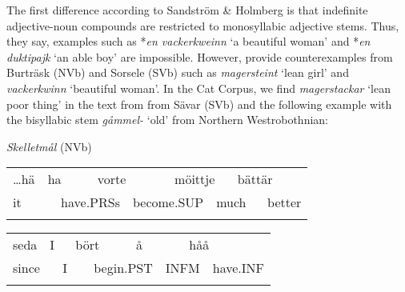 \begin{styleBodytextC}
The first difference according to Sandström \& Holmberg is that indefinite adjective-noun compounds are restricted to monosyllabic adjective stems. Thus, they say, examples such as *\textit{en vackerkweinn }‘a beautiful woman’ and *\textit{en duktipajk }‘an able boy’ are impossible. However, \citet[47]{BergholmEtAl1999} provide counterexamples from Burträsk (NVb) and Sorsele (SVb) such as \textit{magersteint} ‘lean girl’ and \textit{vackerkwinn} ‘beautiful woman’. In the Cat Corpus, we find \textit{magerstackar} ‘lean poor thing’ in the text from from Sävar (SVb) and the following example with the bisyllabic stem \textit{gåmmel-} ‘old’ from Northern Westrobothnian:

\end{styleBodytextC}

\begin{listWWNumileveli}
\item {}

\begin{styleExample}
\textit{Skelletmål} (NVb)

\end{styleExample}

\end{listWWNumileveli}

\begin{tabular}{llllllllll}
\lsptoprule
…hä & \multicolumn{2}{l}{ha

} & \multicolumn{2}{l}{vorte

} & \multicolumn{2}{l}{möittje

} & \multicolumn{2}{l}{bättär

} & \\
\multicolumn{2}{l}{it

} & \multicolumn{2}{l}{have.PRSs

} & \multicolumn{2}{l}{become.SUP

} & \multicolumn{2}{l}{much

} & \multicolumn{2}{l}{better

}\\
\lspbottomrule
\end{tabular}

\begin{tabular}{llllllllll}
\lsptoprule
seda & \multicolumn{2}{l}{I

} & \multicolumn{2}{l}{bört

} & \multicolumn{2}{l}{å

} & \multicolumn{2}{l}{håå

} & \\
\multicolumn{2}{l}{since

} & \multicolumn{2}{l}{I

} & \multicolumn{2}{l}{begin.PST

} & \multicolumn{2}{l}{INFM

} & \multicolumn{2}{l}{have.INF

}\\
\lspbottomrule
\end{tabular}

